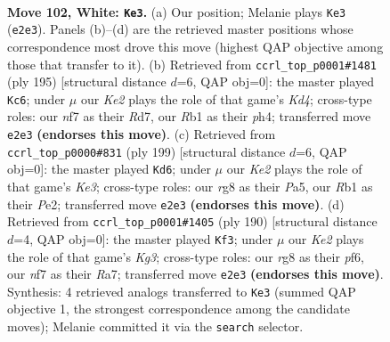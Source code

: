 \documentclass[11pt]{article}
\begin{document}
\clearpage

\begin{figure}[p]\centering
\begin{subfigure}{0.46\textwidth}\centering
\resizebox{\linewidth}{!}{%
\newchessgame
\chessboard[
  setfen={6r1/P2k1n2/8/8/8/8/4K3/1R6 w - - 3 102},
  showmover=false,
  pgfstyle=straightmove, color=movearrow, markmove={e2-e3}
]}
\caption{}
\end{subfigure}\hfill
\begin{subfigure}{0.46\textwidth}\centering
\resizebox{\linewidth}{!}{%
\newchessgame
\chessboard[
  setfen={8/3r4/6K1/3k4/7P/6p1/R7/8 b - - 3 98},
  showmover=false,
  pgfstyle=straightmove, color=movearrow, markmove={d5-c6}
]}
\caption{}
\end{subfigure}
\\[4pt]
\begin{subfigure}{0.46\textwidth}\centering
\resizebox{\linewidth}{!}{%
\newchessgame
\chessboard[
  setfen={8/8/4k3/p7/P2K4/8/4p3/4N3 b - - 67 100},
  showmover=false,
  pgfstyle=straightmove, color=movearrow, markmove={e6-d6}
]}
\caption{}
\end{subfigure}\hfill
\begin{subfigure}{0.46\textwidth}\centering
\resizebox{\linewidth}{!}{%
\newchessgame
\chessboard[
  setfen={8/R7/5p1k/5P2/1r6/6K1/8/8 w - - 4 96},
  showmover=false,
  pgfstyle=straightmove, color=movearrow, markmove={g3-f3}
]}
\caption{}
\end{subfigure}
\caption{\textbf{Move 102, White: \texttt{Ke3}.} (a) Our position; Melanie plays \texttt{Ke3} (\texttt{e2e3}). Panels (b)--(d) are the retrieved master positions whose correspondence most drove this move (highest QAP objective among those that transfer to it). (b) Retrieved from \texttt{ccrl\_top\_p0001\#1481} (ply 195) [structural distance $d$=6, QAP obj=0]: the master played \texttt{Kc6}; under $\mu$ our \emph{Ke2} plays the role of that game's \emph{Kd4}; cross-type roles: our \emph{n}f7 as their \emph{R}d7, our \emph{R}b1 as their \emph{p}h4; transferred move \texttt{e2e3} \textbf{(endorses this move)}. (c) Retrieved from \texttt{ccrl\_top\_p0000\#831} (ply 199) [structural distance $d$=6, QAP obj=0]: the master played \texttt{Kd6}; under $\mu$ our \emph{Ke2} plays the role of that game's \emph{Ke3}; cross-type roles: our \emph{r}g8 as their \emph{P}a5, our \emph{R}b1 as their \emph{P}e2; transferred move \texttt{e2e3} \textbf{(endorses this move)}. (d) Retrieved from \texttt{ccrl\_top\_p0001\#1405} (ply 190) [structural distance $d$=4, QAP obj=0]: the master played \texttt{Kf3}; under $\mu$ our \emph{Ke2} plays the role of that game's \emph{Kg3}; cross-type roles: our \emph{r}g8 as their \emph{p}f6, our \emph{n}f7 as their \emph{R}a7; transferred move \texttt{e2e3} \textbf{(endorses this move)}. Synthesis: 4 retrieved analogs transferred to \texttt{Ke3} (summed QAP objective 1, the strongest correspondence among the candidate moves); Melanie committed it via the \texttt{search} selector.}
\label{fig:thought-m202}
\end{figure}
\end{document}
